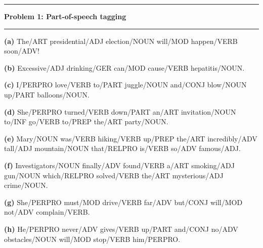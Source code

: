 \documentclass[11pt]{article}
\newcommand\question[2]{\vspace{.25in}\hrule\textbf{#1: #2}\vspace{.5em}\hrule\vspace{.10in}}
\renewcommand\part[1]{\vspace{.10in}\textbf{(#1)}}
\begin{document}
\raggedright

\newcommand\NAME{Jake Pitkin}
\newcommand\UID{u0891770}
\newcommand\HWNUM{1}

\question{Problem 1}{Part-of-speech tagging}

\part{a} The/ART presidential/ADJ election/NOUN will/MOD happen/VERB soon/ADV!

\part{b} Excessive/ADJ drinking/GER can/MOD cause/VERB hepatitis/NOUN.

\part{c} I/PERPRO love/VERB to/PART juggle/NOUN and/CONJ blow/NOUN up/PART balloons/NOUN.

\part{d} She/PERPRO turned/VERB down/PART an/ART invitation/NOUN to/INF go/VERB to/PREP the/ART party/NOUN.

\part{e} Mary/NOUN was/VERB hiking/VERB up/PREP the/ART incredibly/ADV tall/ADJ mountain/NOUN that/RELPRO is/VERB so/ADV famous/ADJ.

\part{f} Investigators/NOUN finally/ADV found/VERB a/ART smoking/ADJ gun/NOUN which/RELPRO solved/VERB the/ART mysterious/ADJ crime/NOUN.

\part{g} She/PERPRO must/MOD drive/VERB far/ADV but/CONJ will/MOD not/ADV complain/VERB.

\part{h} He/PERPRO never/ADV gives/VERB up/PART and/CONJ no/ADV obstacles/NOUN will/MOD stop/VERB him/PERPRO.
\end{document}
